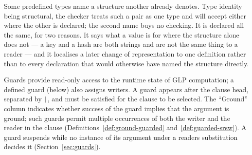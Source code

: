 Some predefined types name a structure another already denotes. Type identity being structural, the checker treats such a pair as one type and will accept either where the other is declared; the second name buys no checking. It is declared all the same, for two reasons. It says what a value is for where the structure alone does not --- a key and a hash are both strings and are not the same thing to a reader --- and it localises a later change of representation to one definition rather than to every declaration that would otherwise have named the structure directly.

Guards provide read-only access to the runtime state of GLP computation; a defined guard (below) also assigns writers. A guard appears after the clause head, separated by \verb=|=, and must be satisfied for the clause to be selected. The ``Ground'' column indicates whether success of the guard implies that the argument is ground; such guards permit multiple occurrences of both the writer and the reader in the clause (Definitions~\ref{def:ground-guarded} and~\ref{def:guarded-srsw}). A guard suspends while no instance of its argument under a readers substitution decides it (Section~\ref{sec:guards}).

